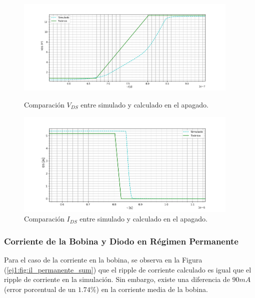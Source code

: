 \begin{figure}[H]
	\centering
	\begin{minipage}{0.45\textwidth}
		\centering
		\includegraphics[width=0.95\textwidth]{ImagenesEjercicio-1/sim_apagado_drain} %
		\caption{Comparación $V_{DS}$ entre simulado y calculado en el apagado.}
		\label{ej1:fig:sim_apagado_drain}
	\end{minipage}\hfill
	\begin{minipage}{0.45\textwidth}
		\centering
		\includegraphics[width=0.95\textwidth]{ImagenesEjercicio-1/sim_apagado_drain_i} %
		\caption{Comparación $I_{DS}$ entre simulado y calculado en el apagado.}
		\label{ej1:fig:sim_apagado_drain_i}
	\end{minipage}
\end{figure}

\subsubsection{Corriente de la Bobina y Diodo en Régimen Permanente}

Para el caso de la corriente en la bobina, se observa en la Figura (\ref{ej1:fig:il_permanente_sum}) que el ripple de corriente calculado es igual que el ripple de corriente en la simulación. Sin embargo, existe una diferencia de $90mA$ (error porcentual de un $1.74\%$) en la corriente media de la bobina.

